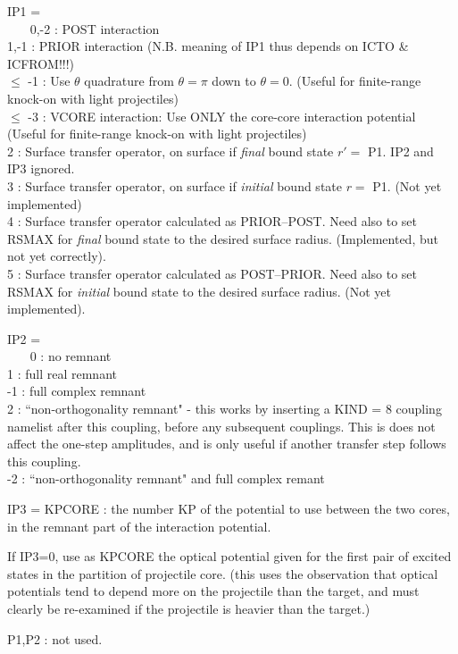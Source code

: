 \documentclass[11pt]{article}
\begin{document}
\begin{description}
IP1 =\\
~~~  0,-2 : POST interaction
\\  1,-1 : PRIOR interaction
 (N.B. meaning of IP1 thus depends on ICTO \& ICFROM!!!)
\\  $\le$ -1 : Use $\theta$ quadrature from $\theta = \pi$ down to $\theta = 0$.
 (Useful for finite-range knock-on with light projectiles)
\\  $\le$ -3 : VCORE interaction:
Use ONLY the core-core interaction potential
 (Useful for finite-range knock-on with light projectiles)
\\ 2 : Surface transfer operator, on surface if {\em final} bound state $r' =$ P1. IP2 and IP3 ignored.
\\ 3 : Surface transfer operator, on surface if {\em initial} bound state $r =$ P1. (Not yet implemented)
\\ 4 : Surface transfer operator calculated as PRIOR--POST. Need also to set RSMAX for {\em final} bound state to the desired surface radius. 
   (Implemented, but not yet correctly).
\\ 5 : Surface transfer operator calculated as POST--PRIOR. Need also to set RSMAX for {\em initial} bound state to the desired surface radius. 
   (Not yet implemented).


IP2 =\\
~~~  0 : no remnant
\\  1 : full real remnant
\\  -1 : full complex remnant
\\  2 : ``non-orthogonality remnant" - this works by inserting
a KIND = 8 coupling namelist after this coupling, before any subsequent
couplings.
This is does not affect the one-step amplitudes, and is only useful
if another transfer step follows this coupling.
\\  -2 : ``non-orthogonality remnant" and full complex remant




 IP3 = KPCORE : the number KP of the potential to use between
the two cores, in the remnant part of the interaction potential.

       If IP3=0, use as KPCORE the optical potential given for
the first pair of excited states in the partition of projectile core.
(this uses the observation that optical potentials tend to depend
more on the projectile than the target, and must clearly be re-examined
if the projectile is heavier than the target.)

 P1,P2 : not used.



\end{description}
\end{document}
